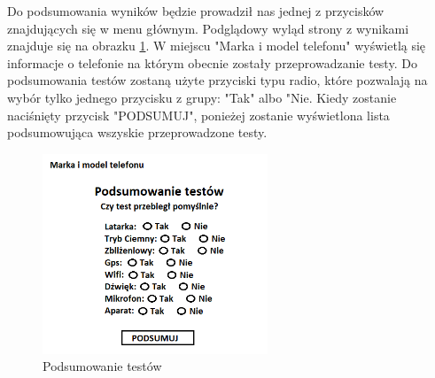 Do podsumowania wyników będzie prowadził nas jednej z przycisków znajdujących się w menu głównym. Podglądowy wyląd strony z wynikami znajduje się na obrazku \ref{rys:wyniki}. W miejscu "Marka i model telefonu" wyświetlą się informacje o telefonie na którym obecnie zostały przeprowadzanie testy. Do podsumowania testów zostaną użyte przyciski typu radio, które pozwalają na wybór tylko jednego przycisku z grupy: "Tak" albo "Nie. Kiedy zostanie naciśnięty przycisk "PODSUMUJ", ponieżej zostanie wyświetlona lista podsumowująca wszyskie przeprowadzone testy.

\begin{figure}[!hbt]
	\begin{center}
		\includegraphics[angle=360, width=0.60\textwidth]{rys/punkt2/wyniki.png}
		\caption{Podsumowanie testów}
		\label{rys:wyniki}
	\end{center}
\end{figure}






